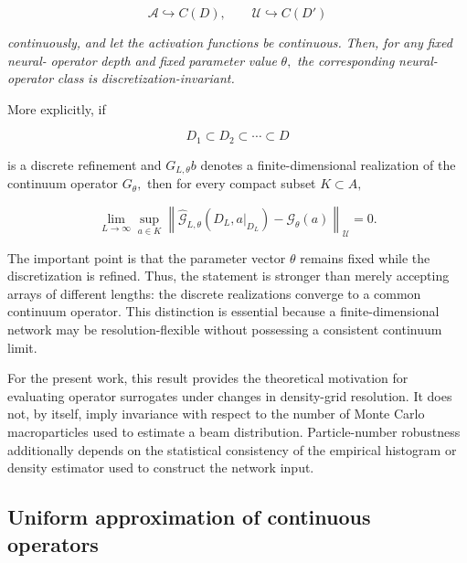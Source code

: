\begin{equation}
\label{eq:231}
\mathcal A\hookrightarrow C(D),\qquad\mathcal U\hookrightarrow C(D')
\end{equation}

\emph{continuously,} \emph{and} \emph{let} \emph{the} \emph{activation} \emph{functions} \emph{be} \emph{continuous.} \emph{Then,} \emph{for} \emph{any} \emph{fixed} \emph{neural-} \emph{operator} \emph{depth} \emph{and} \emph{fixed} \emph{parameter} \emph{value} \(\theta ,\) \emph{the} \emph{corresponding} \emph{neural-operator} \emph{class} \emph{is} \emph{discretization-invariant.}

More explicitly, if

\begin{equation}
\label{eq:232}
D_1\subset D_2\subset\cdots\subset D
\end{equation}

is a discrete refinement and \(G_{L , \theta} b\) denotes a finite-dimensional realization of the continuum operator \(G_{\theta} ,\) then for every compact subset \(K \subset A ,\)

\begin{equation}
\label{eq:233}
\lim_{L\to\infty}\sup_{a\in K}\left\|\widehat{\mathcal G}_{L,\theta}(D_L,a|_{D_L})-\mathcal G_{\theta}(a)\right\|_{\mathcal U}=0.
\end{equation}

The important point is that the parameter vector \(\theta\) remains fixed while the discretization is refined. Thus, the statement is stronger than merely accepting arrays of different lengths: the discrete realizations converge to a common continuum operator. This distinction is essential because a finite-dimensional network may be resolution-flexible without possessing a consistent continuum limit.

For the present work, this result provides the theoretical motivation for evaluating operator surrogates under changes in density-grid resolution. It does not, by itself, imply invariance with respect to the number of Monte Carlo macroparticles used to estimate a beam distribution. Particle-number robustness additionally depends on the statistical consistency of the empirical histogram or density estimator used to construct the network input.

\subsection{Uniform approximation of continuous operators}
\label{sec:auxiliary_theoretical_results_uniform_approximation_of_continuous_operators}

